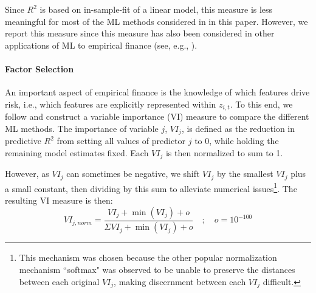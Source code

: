 \documentclass{article}
\begin{document}
Since $R^2$ is based on in-sample-fit of a linear model, this measure is less meaningful for most of the ML methods considered in in this paper. However, we report this measure since this measure has also been considered in other applications of ML to empirical finance (see, e.g., \cite{gu_empirical_2019}). 
\paragraph{Factor Selection}
An important aspect of empirical finance is the knowledge of which features drive risk, i.e., which features are explicitly represented within $z_{i,t}$. To this end, we follow \cite{gu_empirical_2019}  and construct a variable importance (VI) measure to compare the different ML methods. The importance of variable $j$, $VI_j$, is defined as the reduction in predictive $R^2$ from setting all values of predictor $j$ to 0, while holding the remaining model estimates fixed. Each $VI_j$ is then normalized to sum to 1. 

However, as $VI_j$ can sometimes be negative, we shift $VI_j$ by the smallest $VI_j$ plus a small constant, then dividing by this sum to alleviate numerical issues\footnote{This mechanism was chosen because the other popular normalization mechanism ``softmax" was observed to be unable to preserve the distances between each original $VI_j$, making discernment between each $VI_j$ difficult.}. The resulting VI measure is then:
\begin{equation}
VI_{j, norm} = \frac{VI_j + \operatorname{min}(VI_j) + o}
{\Sigma VI_j + \operatorname{min}(VI_j) + o} \quad ; \quad o = 10^{-100}
\end{equation}

\end{document}
